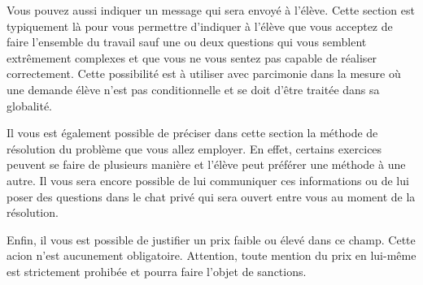 Vous pouvez aussi indiquer un message qui sera envoyé à l'élève. Cette section est typiquement là pour vous permettre d'indiquer à l'élève que vous acceptez de faire l'ensemble du travail sauf une ou deux questions qui vous semblent extrêmement complexes et que vous ne vous sentez pas capable de réaliser correctement. Cette possibilité est à utiliser avec parcimonie dans la mesure où une demande élève n'est pas conditionnelle et se doit d'être traitée dans sa globalité.

Il vous est également possible de préciser dans cette section la méthode de résolution du problème que vous allez employer. En effet, certains exercices peuvent se faire de plusieurs manière et l'élève peut préférer une méthode à une autre. Il vous sera encore possible de lui communiquer ces informations ou de lui poser des questions dans le chat privé qui sera ouvert entre vous au moment de la résolution.

Enfin, il vous est possible de justifier un prix faible ou élevé dans ce champ. Cette acion n'est aucunement obligatoire. Attention, toute mention du prix en lui-même est strictement prohibée et pourra faire l'objet de sanctions.